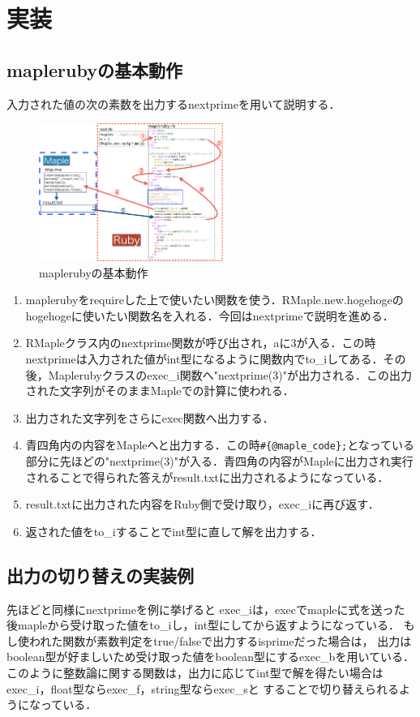 \section{実装}
\subsection{maplerubyの基本動作}
入力された値の次の素数を出力するnextprimeを用いて説明する．

\begin{figure}[htbp]\begin{center}
\includegraphics[width=6cm,bb=0 0 442 500]{../figs/./mapleruby_eringi.003.png}
\caption{maplerubyの基本動作}
\label{default}\end{center}\end{figure}
\begin{enumerate}
\item maplerubyをrequireした上で使いたい関数を使う．RMaple.new.hogehogeのhogehogeに使いたい関数名を入れる．今回はnextprimeで説明を進める．
\item RMapleクラス内のnextprime関数が呼び出され，aに3が入る．この時nextprimeは入力された値がint型になるように関数内でto\_iしてある．その後，Maplerubyクラスのexec\_i関数へ"nextprime(3)"が出力される．この出力された文字列がそのままMapleでの計算に使われる．
\item 出力された文字列をさらにexec関数へ出力する．
\item 青四角内の内容をMapleへと出力する．この時\verb|#{@maple_code};|となっている部分に先ほどの"nextprime(3)"が入る．青四角の内容がMapleに出力され実行されることで得られた答えがresult.txtに出力されるようになっている．
\item result.txtに出力された内容をRuby側で受け取り，exec\_iに再び返す．
\item 返された値をto\_iすることでint型に直して解を出力する．
\end{enumerate}
\subsection{出力の切り替えの実装例}
先ほどと同様にnextprimeを例に挙げると
exec\_iは，execでmapleに式を送った後mapleから受け取った値をto\_iし，int型にしてから返すようになっている．
もし使われた関数が素数判定をtrue/falseで出力するisprimeだった場合は，
出力はboolean型が好ましいため受け取った値をboolean型にするexec\_bを用いている．
このように整数論に関する関数は，出力に応じてint型で解を得たい場合はexec\_i，float型ならexec\_f，string型ならexec\_sと
することで切り替えられるようになっている．

